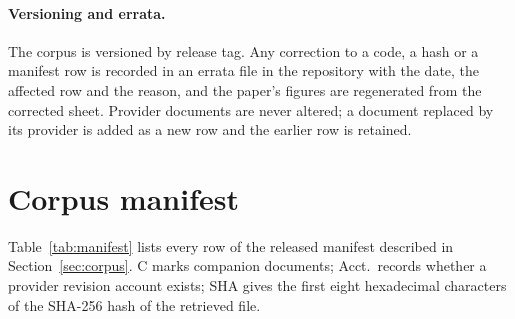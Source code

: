 \documentclass{article}
\begin{document}
\paragraph{Versioning and errata.} The corpus is versioned by release tag. Any correction to a code, a hash or a manifest row is recorded in an errata file in the repository with the date, the affected row and the reason, and the paper's figures are regenerated from the corrected sheet. Provider documents are never altered; a document replaced by its provider is added as a new row and the earlier row is retained.


\section{Corpus manifest}
\label{apx:manifest}
Table~\ref{tab:manifest} lists every row of the released manifest described in Section~\ref{sec:corpus}. C marks companion documents; Acct.\ records whether a provider revision account exists; SHA gives the first eight hexadecimal characters of the SHA-256 hash of the retrieved file.
\begin{table}[tbp]\centering\tiny
\caption{Corpus manifest.}
\label{tab:manifest}
\end{table}
\end{document}
